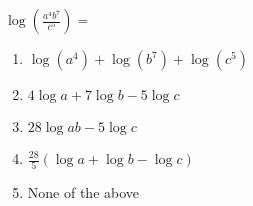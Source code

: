 \bigskip

\item $\log \left( \frac{a^4 b^7}{c^5} \right) = $

\begin{enumerate}
\item $ \log (a^4) +  \log (b^7) + \log (c^5)$
\item $4 \log a + 7 \log b - 5 \log c$
\item $28 \log ab - 5 \log c$
\item $\frac{28}{5} \left( \log a+\log b -  \log c \right)$
\item None of the above
\end{enumerate}

